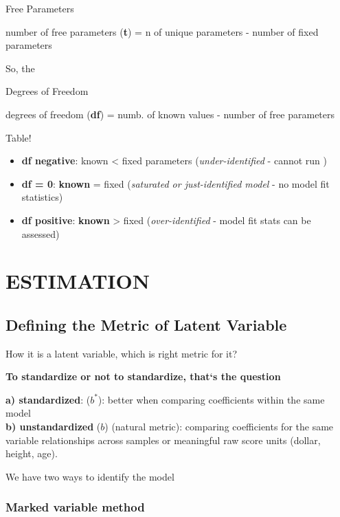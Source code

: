 \documentclass[
]{article}
\begin{document}
Free Parameters

number of free parameters (\textbf{t}) = n of unique parameters - number
of fixed parameters

So, the

Degrees of Freedom

degrees of freedom (\textbf{df}) = numb. of known values - number of
free parameters

Table!

\begin{itemize}
\item
  \textbf{df negative}: known \textless{} fixed parameters
  (\emph{under-identified} - { cannot run })
\item
  \textbf{df = 0}: \textbf{known} = fixed (\emph{saturated or
  just-identified model} - no model fit statistics)
\item
  \textbf{df positive}: \textbf{known} \textgreater{} fixed
  (\emph{over-identified} - model fit stats can be assessed)
\end{itemize}

\hypertarget{estimation}{%
\section{ESTIMATION}\label{estimation}}

\hypertarget{defining-the-metric-of-latent-variable}{%
\subsection{Defining the Metric of Latent
Variable}\label{defining-the-metric-of-latent-variable}}

How it is a latent variable, which is right metric for it?

\textbf{To standardize or not to standardize, that`s the question}

\textbf{a) standardized}: (\(b^{*}\)): better when comparing
coefficients within the same model\\

\textbf{b) unstandardized} (\(b\)) (natural metric): comparing
coefficients for the same variable relationships across samples or
meaningful raw score units (dollar, height, age).

We have two ways to identify the model

\hypertarget{marked-variable-method}{%
\subsubsection{Marked variable method}\label{marked-variable-method}}
\end{document}
